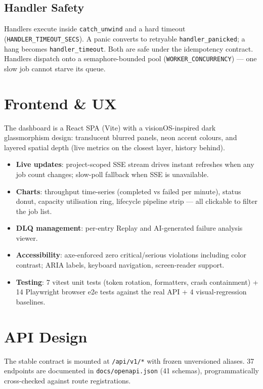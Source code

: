 \documentclass[11pt,a4paper]{article}
\begin{document}
\subsection{Handler Safety}

Handlers execute inside \texttt{catch\_unwind} and a hard timeout
(\texttt{HANDLER\_TIMEOUT\_SECS}). A panic converts to retryable
\texttt{handler\_panicked}; a hang becomes \texttt{handler\_timeout}. Both are
safe under the idempotency contract. Handlers dispatch onto a semaphore-bounded
pool (\texttt{WORKER\_CONCURRENCY}) — one slow job cannot starve its queue.

\section{Frontend \& UX}

The dashboard is a React SPA (Vite) with a visionOS-inspired dark glassmorphism
design: translucent blurred panels, neon accent colours, and layered spatial
depth (live metrics on the closest layer, history behind).

\begin{itemize}[nosep]
\item \textbf{Live updates}: project-scoped SSE stream drives instant refreshes
when any job count changes; slow-poll fallback when SSE is unavailable.
\item \textbf{Charts}: throughput time-series (completed vs failed per minute),
status donut, capacity utilisation ring, lifecycle pipeline strip — all
clickable to filter the job list.
\item \textbf{DLQ management}: per-entry Replay and AI-generated failure
analysis viewer.
\item \textbf{Accessibility}: axe-enforced zero critical/serious violations
including color contrast; ARIA labels, keyboard navigation, screen-reader
support.
\item \textbf{Testing}: 7 vitest unit tests (token rotation, formatters, crash
containment) + 14 Playwright browser e2e tests against the real API + 4
visual-regression baselines.
\end{itemize}

\section{API Design}

The stable contract is mounted at \texttt{/api/v1/*} with frozen unversioned
aliases. 37 endpoints are documented in \texttt{docs/openapi.json}
(41 schemas), programmatically cross-checked against route registrations.
\end{document}
